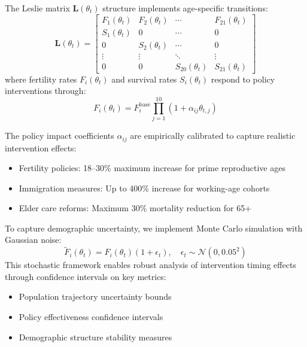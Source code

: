 \documentclass{article} %
\begin{document}
The Leslie matrix $\mathbf{L}(\theta_t)$ structure implements age-specific transitions:
\begin{equation}
\label{eq:leslie}
\mathbf{L}(\theta_t) = \begin{bmatrix}
F_1(\theta_t) & F_2(\theta_t) & \cdots & F_{21}(\theta_t) \\
S_1(\theta_t) & 0 & \cdots & 0 \\
0 & S_2(\theta_t) & \cdots & 0 \\
\vdots & \vdots & \ddots & \vdots \\
0 & 0 & S_{20}(\theta_t) & S_{21}(\theta_t)
\end{bmatrix}
\end{equation}
where fertility rates $F_i(\theta_t)$ and survival rates $S_i(\theta_t)$ respond to policy interventions through:
\begin{equation}
\label{eq:policy}
F_i(\theta_t) = F_i^{\text{base}} \prod_{j=1}^{10} (1 + \alpha_{ij}\theta_{t,j})
\end{equation}

The policy impact coefficients $\alpha_{ij}$ are empirically calibrated to capture realistic intervention effects:
\begin{itemize}
    \item Fertility policies: 18--30\% maximum increase for prime reproductive ages
    \item Immigration measures: Up to 400\% increase for working-age cohorts
    \item Elder care reforms: Maximum 30\% mortality reduction for 65+
\end{itemize}

To capture demographic uncertainty, we implement Monte Carlo simulation with Gaussian noise:
\begin{equation}
\label{eq:noise}
\tilde{F}_i(\theta_t) = F_i(\theta_t)(1 + \epsilon_t), \quad \epsilon_t \sim \mathcal{N}(0, 0.05^2)
\end{equation}
This stochastic framework enables robust analysis of intervention timing effects through confidence intervals on key metrics:
\begin{itemize}
    \item Population trajectory uncertainty bounds
    \item Policy effectiveness confidence intervals
    \item Demographic structure stability measures
\end{itemize}
\end{document}
